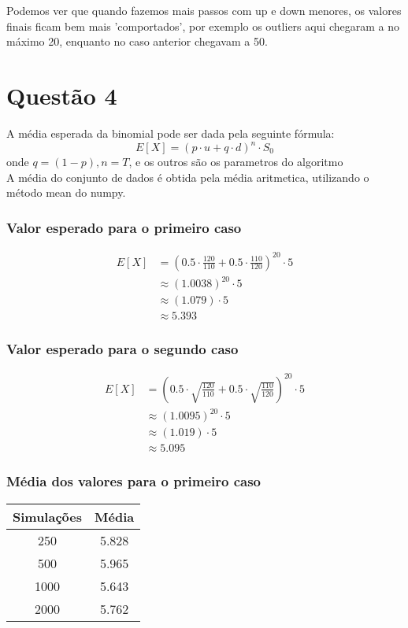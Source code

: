 \documentclass[
	11pt,				%
	openright,			%
	oneside,			%
	a4paper,			%
	english,			%
	french,				%
	spanish,			%
	brazil,				%
	]{abntex2}
\begin{document}
Podemos ver que quando fazemos mais passos com up e down menores, os valores finais ficam bem mais 'comportados', por exemplo os outliers aqui chegaram a no máximo 20, enquanto no caso anterior chegavam a 50.
\chapter{Questão 4}
A média esperada da binomial pode ser dada pela seguinte fórmula:
$$E[X] = (p\cdot u + q\cdot d)^n \cdot S_0$$
onde $q = (1-p), n = T$, e os outros são os parametros do algoritmo\\
A média do conjunto de dados é obtida pela média aritmetica, utilizando o método {\color{red} mean} do numpy.

\subsection{Valor esperado para o primeiro caso}
\begin{align*}
  E[X] &= \left(0.5 \cdot \frac{120}{110} + 0.5 \cdot \frac{110}{120}\right)^{20} \cdot 5\\
  &\approx (1.0038)^{20} \cdot 5\\
  &\approx (1.079) \cdot 5\\
  &\approx 5.393
\end{align*}
\subsection{Valor esperado para o segundo caso}
\begin{align*}
  E[X] &= \left(0.5 \cdot \sqrt{\frac{120}{110}} + 0.5 \cdot \sqrt{\frac{110}{120}}\right)^{20} \cdot 5\\
  &\approx (1.0095)^{20} \cdot 5\\
  &\approx (1.019) \cdot 5\\
  &\approx 5.095
\end{align*}

\subsection{Média dos valores para o primeiro caso}
\begin{tabular}{cc}
	\toprule
	Simulações & Média\\
	\midrule
250 & 5.828 \\
500 & 5.965 \\
1000 & 5.643 \\
2000 & 5.762
\end{tabular}
\end{document}
